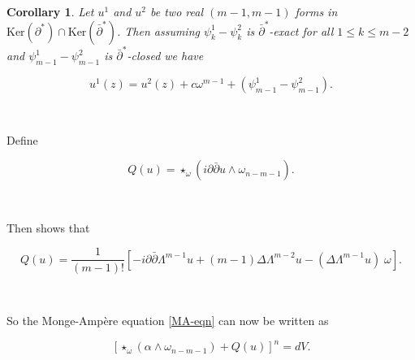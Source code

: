 \documentclass[11pt,letterpaper]{amsart}
\newcommand{\sbpartial}{\bar{\partial}^*}
\newcommand{\spartial}{\partial^*}
\newcommand{\bpartial}{\bar{\partial}}
\newcommand{\pbp}{\partial \bar{\partial}}
\newcommand{\Ker}{\mbox{Ker}}
\newtheorem{corollary}[theorem]{Corollary}
\numberwithin{equation}{section}
\begin{document}




\begin{corollary}\label{lemma3}
    Let $u^1$ and $u^2$ be two real $(m-1,m-1)$ forms in $\Ker (\spartial) \cap \Ker( \bar{\partial}^*)$. Then assuming $\psi^1_{k} -\psi^2_{k}$ is $\sbpartial$-exact for all $1 \leq k \leq m-2$ and $\psi^1_{m-1} -\psi^2_{m-1}$ is $\sbpartial$-closed 
    we have 
    
    $$u^1(z) = u^2(z) + c \omega^{m-1} + (\psi^1_{m-1} -\psi^2_{m-1}).$$
    
\end{corollary}


\ 



Define

\begin{equation}
Q(u) = \star_{\omega}(i \pbp u \wedge \omega_{n-m-1}).
\end{equation}

\

Then \cite[Cor.~3.4]{DP25} shows that

\begin{equation}\label{defineQ}
        Q(u)= \frac{1}{(m-1)!}\left[-i \pbp \Lambda^{m-1} u + (m-1) \Delta \Lambda^{m-2} u - (\Delta \Lambda^{m-1} u) \;\omega\right].
\end{equation}



\

So the Monge-Amp\`ere equation \eqref{MA-eqn} can now be written as 

\begin{equation}\label{QMA-eqn}
    \left[\star_{\omega}(\alpha\wedge \omega_{n-m-1}) + Q(u)\right]^n = dV.
\end{equation}

\
\end{document}
